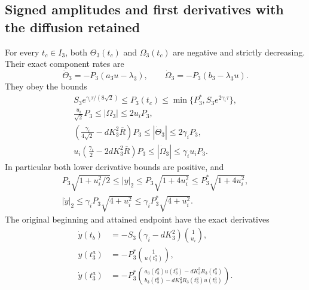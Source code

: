 \subsection{Signed amplitudes and first derivatives with the diffusion retained}

\begin{theorem}\label{tgdc:first_derivatives}
For every $t_c\in I_3$, both $\Theta_3(t_c)$ and $\Omega_3(t_c)$
are negative and strictly decreasing. Their exact component rates are
\begin{equation}\label{tgdc:exact_first}
 \dot\Theta_3=-P_3(a_3u-\lambda_3),\qquad
 \dot\Omega_3=-P_3(b_3-\lambda_3u).
\end{equation}
They obey the bounds
\begin{equation}\label{tgdc:component_bounds}
\begin{gathered}
 S_3e^{\gamma_i\tau/(8\sqrt2)}
 \leq P_3(t_c)\leq\min\{P_3^*,S_3e^{2\gamma_i\tau}\},\\
 \frac{u_i}{\sqrt2}P_3\leq |\Omega_3|\leq2u_iP_3,\\
 \left(\frac{\gamma_i}{4\sqrt2}-dK_3^2\overline R\right)P_3
 \leq |\dot\Theta_3|\leq2\gamma_iP_3,\\
 u_i\left(\frac{\gamma_i}{2}-2dK_3^2\overline R\right)P_3
 \leq |\dot\Omega_3|\leq\gamma_i u_iP_3.
\end{gathered}
\end{equation}
In particular both lower derivative bounds are positive, and
\begin{equation}\label{tgdc:norm_bounds}
\begin{gathered}
 P_3\sqrt{1+u_i^2/2}\leq |y|_2
       \leq P_3\sqrt{1+4u_i^2}\leq P_3^*\sqrt{1+4u_i^2},\\
 |\dot y|_2\leq\gamma_iP_3\sqrt{4+u_i^2}
       \leq\gamma_iP_3^*\sqrt{4+u_i^2}.
\end{gathered}
\end{equation}
The original beginning and attained endpoint have the exact derivatives
\begin{equation}\label{tgdc:endpoint_derivatives}
\begin{aligned}
 \dot y(t_b)&=-S_3(\gamma_i-dK_3^2)\binom1{u_i},\\
 y(t_3^a)&=-P_3^*\binom1{u(t_3^a)},\\
 \dot y(t_3^a)&=-P_3^*
 \binom{a_3(t_3^a)u(t_3^a)-dK_3^2R_3(t_3^a)}
       {b_3(t_3^a)-dK_3^2R_3(t_3^a)u(t_3^a)}.
\end{aligned}
\end{equation}
\end{theorem}
